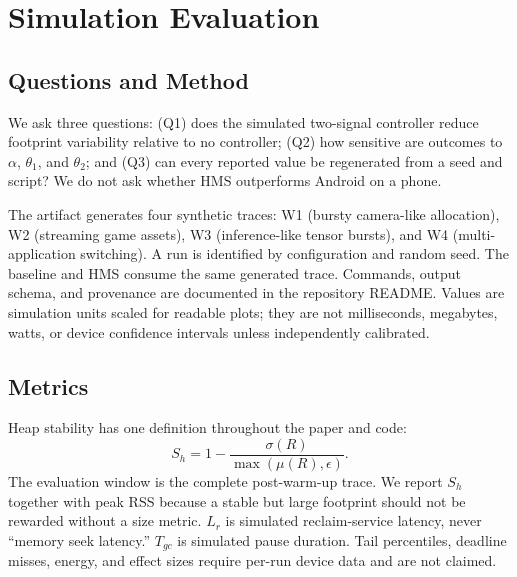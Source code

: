 \section{Simulation Evaluation}
\label{sec_eval}
\subsection{Questions and Method}
We ask three questions: (Q1) does the simulated two-signal controller reduce
footprint variability relative to no controller; (Q2) how sensitive are outcomes
to $\alpha$, $\theta_1$, and $\theta_2$; and (Q3) can every reported value be
regenerated from a seed and script?  We do not ask whether HMS outperforms Android
on a phone.

The artifact generates four synthetic traces: W1 (bursty camera-like allocation),
W2 (streaming game assets), W3 (inference-like tensor bursts), and W4
(multi-application switching).  A run is identified by configuration and random
seed.  The baseline and HMS consume the same generated trace.  Commands, output
schema, and provenance are documented in the repository README.  Values are
simulation units scaled for readable plots; they are not milliseconds, megabytes,
watts, or device confidence intervals unless independently calibrated.

\subsection{Metrics}
Heap stability has one definition throughout the paper and code:
\[
S_h=1-\frac{\sigma(R)}{\max(\mu(R),\epsilon)} .
\]
The evaluation window is the complete post-warm-up trace.  We report $S_h$ together
with peak RSS because a stable but large footprint should not be rewarded without a
size metric.  $L_r$ is simulated reclaim-service latency, never ``memory seek
latency.''  $T_{gc}$ is simulated pause duration.  Tail percentiles, deadline
misses, energy, and effect sizes require per-run device data and are not claimed.

